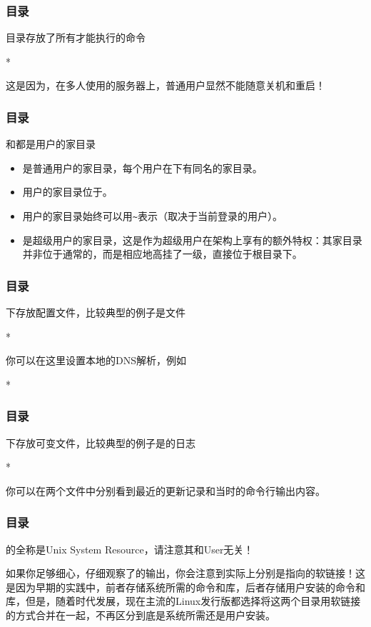 \begin{frame}
    \frametitle{目录}
    目录存放了所有才能执行的命令
    \begin{Code}*
        
    \end{Code}
    这是因为，在多人使用的服务器上，普通用户显然不能随意关机和重启！ 
\end{frame}

\begin{frame}
    \frametitle{目录}
    和都是用户的家目录
    \begin{itemize}
        \item {}是普通用户的家目录，每个用户在下有同名的家目录。
        \item 用户的家目录位于。
        \item 用户的家目录始终可以用\texttt{\textasciitilde{}}表示（取决于当前登录的用户）。
        \item {}是超级用户的家目录，这是作为超级用户在架构上享有的额外特权：其家目录并非位于通常的，而是相应地高挂了一级，直接位于根目录下。
    \end{itemize}
\end{frame}

\begin{frame}
    \frametitle{目录}
    下存放配置文件，比较典型的例子是文件
    \begin{Code}*
        
    \end{Code}
    你可以在这里设置本地的DNS解析，例如
    \begin{Code}*
        
    \end{Code}
\end{frame}

\begin{frame}
    \frametitle{目录}
    下存放可变文件，比较典型的例子是的日志
    \begin{Code}*
        
    \end{Code}
    你可以在两个文件中分别看到最近的更新记录和当时的命令行输出内容。
\end{frame}

\begin{frame}
    \frametitle{目录}
    的全称是Unix System Resource，请注意其和User无关！

    如果你足够细心，仔细观察了的输出，你会注意到实际上分别是指向的软链接！这是因为早期的实践中，前者存储系统所需的命令和库，后者存储用户安装的命令和库，但是，随着时代发展，现在主流的Linux发行版都选择将这两个目录用软链接的方式合并在一起，不再区分到底是系统所需还是用户安装。
\end{frame}


